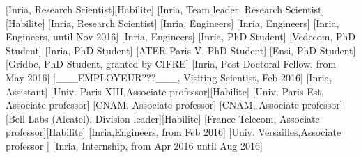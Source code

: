 \documentclass{ra2016}
\begin{document}
\begin{composition}
[Inria, Research Scientist][Habilite]
[Inria, Team leader, Research Scientist][Habilite]
[Inria, Research Scientist]
[Inria, Engineers]
[Inria, Engineers]
[Inria, Engineers, until Nov 2016]
[Inria, Engineers]
[Inria, PhD Student]
[Vedecom, PhD Student]
[Inria, PhD Student]
[ATER Paris V, PhD Student]
[Ensi, PhD Student]
[Gridbe, PhD Student, granted by CIFRE]
[Inria, Post-Doctoral Fellow, from May 2016]
[\_\_\_EMPLOYEUR???\_\_\_, Visiting Scientist, Feb 2016]
[Inria, Assistant]
[Univ. Paris XIII,Associate professor][Habilite]
[Univ. Paris Est, Associate professor]
[CNAM,  Associate professor]
[CNAM, Associate professor]
[Bell Labs (Alcatel), Division leader][Habilite]
[France Telecom, Associate professor][Habilite]
[Inria,Engineers, from Feb 2016]
[Univ. Versailles,Associate professor ]
[Inria, Internship, from Apr 2016 until Aug 2016]
\end{composition}






\end{document}
